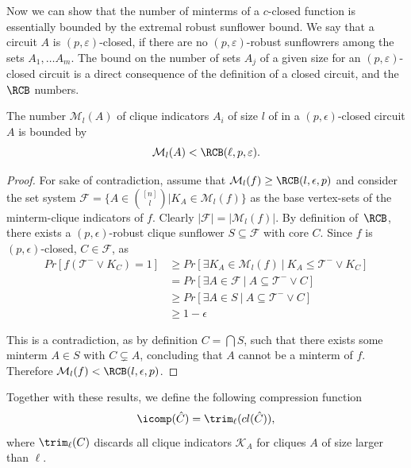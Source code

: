 Now we can show that the number of minterms of a $c$-closed function is essentially bounded by the extremal robust sunflower bound.
\fi
We say that a circuit $A$ is $(p, \varepsilon)$-closed, if there are no $(p, \varepsilon)$-robust sunflowrers among the sets $A_1, \ldots A_m$.
The bound on the number of sets $A_j$ of a given size for an $(p, \varepsilon)$-closed circuit is a direct consequence of the definition of a closed circuit, and the $\RCB$ numbers. 
\begin{fact}
\label{lem:minterms-bound}
    The number $\mathcal{M}_l(A)$ of clique indicators $A_i$  of size $l$ of in a $(p, \epsilon)$-closed circuit $A$ is bounded by $$\mathcal{M}_l(A) < \RCB(\ell, p, \varepsilon).$$
\end{fact}
\iffalse
\begin{proof}
    For sake of contradiction, assume that $\mathcal{M}_l(f) \geq \RCB(l, \epsilon, p)$ and consider the set system $\mathcal{F} = \{A \in \binom{[n]}{l} | K_A \in \mathcal{M}_l(f)\}$ as the base vertex-sets of the minterm-clique indicators of $f$. Clearly $|\mathcal{F}| = |\mathcal{M}_l(f)|$. By definition of~$\RCB$, there exists a $(p, \epsilon)$-robust clique sunflower $S\subseteq \mathcal{F}$ with core $C$. Since $f$ is $(p, \epsilon)$-closed,  $C \in \mathcal{F}$, as
    \begin{align}
        Pr[f(\mathcal{T}^- \vee K_C) = 1] & \geq  Pr[\exists K_A \in \mathcal{M}_l(f) \ | \ K_A \leq \mathcal{T}^- \vee K_C] \\
        & =  Pr[\exists A \in \mathcal{F} \ | \ A \subseteq \mathcal{T}^- \vee C] \\
        & \geq Pr[\exists A \in S \ | \ A \subseteq \mathcal{T}^- \vee C] \\
        & \geq 1-\epsilon
    \end{align}

    This is a contradiction, as by definition $C = \bigcap S$, such that there exists some minterm $A \in S$ with $C \subsetneq A$, concluding that $A$ cannot be a minterm of $f$. Therefore $\mathcal{M}_l(f) < \RCB(l, \epsilon, p)$.
\end{proof}

Together with these results, we define the following compression function 
$$\icomp(\hat{C}) = \trim_\ell(cl(\hat{C})),$$
where $\trim_\ell(C)$ discards all clique indicators $\mathcal{K}_A$ for cliques $A$ of size larger than $\ell$.

